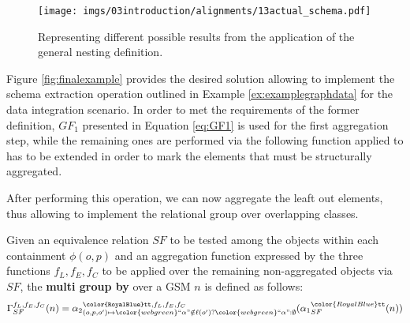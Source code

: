 \begin{figure}[!t]
	\ContinuedFloat
	\centering
	\begin{minipage}[t]{0.5\textwidth}
		\centering
		\texttt{[image: imgs/03introduction/alignments/13actual\_schema.pdf]}
		\label{fig:finalexample}
	\end{minipage}
	\caption{Representing different possible results from the application of the general nesting definition.}
\end{figure}
\begin{example}[continues=ex:aggregations2]
Figure \vref{fig:finalexample} provides the desired solution allowing to implement the schema extraction operation outlined in Example \vref{ex:examplegraphdata} for the data integration scenario.
In order to met the requirements of the former definition, $GF_1$ presented in Equation \vref{eq:GF1} is used for the first aggregation step, while the remaining ones are performed via the following function applied to has to be extended in order to mark the elements that must be structurally aggregated.
\end{example}

After performing this operation, we can now aggregate the leaft out elements, thus allowing to implement the relational group over overlapping classes.

\begin{definition}
Given an equivalence relation $SF$ to be tested among the objects within each containment $\phi(o,p)$ and an aggregation function expressed by the three functions $f_L,f_E,f_C$ to be applied over the remaining non-aggregated objects via $SF$, the \textbf{multi group by} over a GSM $n$ is defined as follows:
	\[\Gamma_{SF}^{f_L,f_E,f_C}(n)={\alpha_2}_{(o,p,o')\mapsto {\color{webgreen}\textup{``}\alpha\textup{''}}\notin\ell(o')?{\color{webgreen}\textup{``}\alpha\textup{''}}:\emptyset}^{\texttt{\color{RoyalBlue}tt},f_L,f_E,f_C}({\alpha_1}_{SF}^{{\color{RoyalBlue}\texttt{tt}}}(n))\]
\end{definition}

